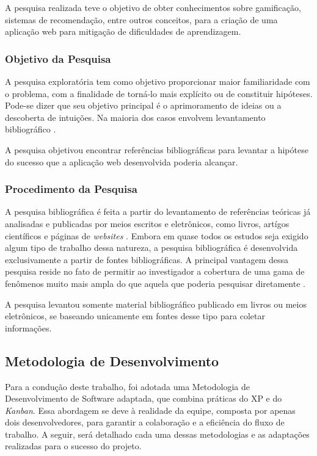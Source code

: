 A pesquisa realizada teve o objetivo de obter conhecimentos sobre gamificação, sistemas de recomendação, entre outros conceitos, para a criação de uma aplicação web para mitigação de dificuldades de aprendizagem.

\subsubsection[Objetivo da Pesquisa]{Objetivo da Pesquisa}

A pesquisa exploratória tem como objetivo proporcionar maior familiaridade com o problema, com a finalidade de torná-lo mais explícito ou de constituir hipóteses. Pode-se dizer que seu objetivo principal é o aprimoramento de ideias ou a descoberta de intuições. Na maioria dos casos envolvem levantamento bibliográfico \cite{gil2002elaborar}.

A pesquisa objetivou encontrar referências bibliográficas para levantar a hipótese do sucesso que a aplicação web desenvolvida poderia alcançar.

\subsubsection[Procedimento da Pesquisa]{Procedimento da Pesquisa}

A pesquisa bibliográfica é feita a partir do levantamento de referências teóricas já analisadas e publicadas por meios escritos e eletrônicos, como livros, artígos científicos e páginas de \textit{websites} \cite{gerhardt2009metodos}. Embora em quase todos os estudos seja exigido algum tipo de trabalho dessa natureza, a pesquisa bibliográfica é desenvolvida exclusivamente a partir de fontes bibliográficas. A principal vantagem dessa pesquisa reside no fato de permitir ao investigador a cobertura de uma gama de fenômenos muito mais ampla do que aquela que poderia pesquisar diretamente \cite{gil2002elaborar}.

A pesquisa levantou somente material bibliográfico publicado em livros ou meios eletrônicos, se baseando unicamente em fontes desse tipo para coletar informações.

\subsection[Metodologia de Desenvolvimento]{Metodologia de Desenvolvimento}
\label{metodologia-desenvolvimento}

Para a condução deste trabalho, foi adotada uma Metodologia de Desenvolvimento de Software adaptada, que combina práticas do XP e do \textit{Kanban}. Essa abordagem se deve à realidade da equipe, composta por apenas dois desenvolvedores, para garantir a colaboração e a eficiência do fluxo de trabalho. A seguir, será detalhado cada uma dessas metodologias e as adaptações realizadas para o sucesso do projeto.

